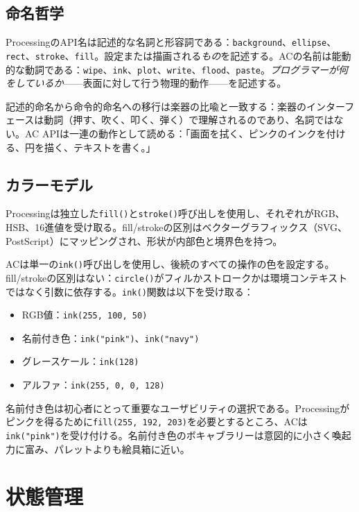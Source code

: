 \documentclass[10pt,letterpaper,twocolumn]{article}
\begin{document}
\subsection{命名哲学}

ProcessingのAPI名は記述的な名詞と形容詞である：\texttt{background}、\texttt{ellipse}、\texttt{rect}、\texttt{stroke}、\texttt{fill}。設定または描画される\emph{もの}を記述する。ACの名前は能動的な動詞である：\texttt{wipe}、\texttt{ink}、\texttt{plot}、\texttt{write}、\texttt{flood}、\texttt{paste}。\emph{プログラマーが何をしているか}——表面に対して行う物理的動作——を記述する。

記述的命名から命令的命名への移行は楽器の比喩と一致する：楽器のインターフェースは動詞（押す、吹く、叩く、弾く）で理解されるのであり、名詞ではない。AC APIは一連の動作として読める：「画面を拭く、ピンクのインクを付ける、円を描く、テキストを書く。」

\subsection{カラーモデル}

Processingは独立した\texttt{fill()}と\texttt{stroke()}呼び出しを使用し、それぞれがRGB、HSB、16進値を受け取る。fill/strokeの区別はベクターグラフィックス（SVG、PostScript）にマッピングされ、形状が内部色と境界色を持つ。

ACは単一の\texttt{ink()}呼び出しを使用し、後続のすべての操作の色を設定する。fill/strokeの区別はない：\texttt{circle()}がフィルかストロークかは環境コンテキストではなく引数に依存する。\texttt{ink()}関数は以下を受け取る：

\begin{itemize}
  \item RGB値：\texttt{ink(255, 100, 50)}
  \item 名前付き色：\texttt{ink("pink")}、\texttt{ink("navy")}
  \item グレースケール：\texttt{ink(128)}
  \item アルファ：\texttt{ink(255, 0, 0, 128)}
\end{itemize}

名前付き色は初心者にとって重要なユーザビリティの選択である。Processingがピンクを得るために\texttt{fill(255, 192, 203)}を必要とするところ、ACは\texttt{ink("pink")}を受け付ける。名前付き色のボキャブラリーは意図的に小さく喚起力に富み、パレットよりも絵具箱に近い。


\section{状態管理}
\label{sec:state}
\end{document}
